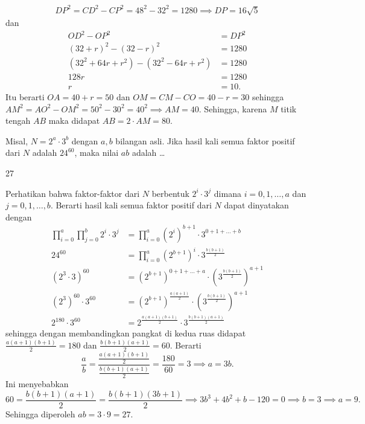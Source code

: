 \begin{solusi}
\begin{align*}
DP^2 = CD^2 - CP^2 = 48^2 - 32^2 = 1280 \implies DP = 16\sqrt{5}
\end{align*}
dan
\begin{align*}
OD^2 - OP^2 &= DP^2\\
(32+r)^2 - (32-r)^2 &= 1280\\
(32^2+64r+r^2)-(32^2-64r+r^2) &= 1280\\
128r &= 1280\\
r &= 10.
\end{align*}
Itu berarti $OA=40+r=50$ dan $OM = CM - CO = 40-r=30$ sehingga $AM^2 = AO^2-OM^2 = 50^2 - 30^2 = 40^2 \implies AM = 40$. Sehingga, karena $M$ titik tengah $AB$ maka didapat $AB = 2 \cdot AM = \boxed{80}$.
\end{solusi}

\begin{soalbaru}
Misal, $N = 2^a \cdot 3^b$ dengan $a, b$ bilangan asli. Jika hasil kali semua faktor positif dari $N$ adalah $24^{60}$, maka nilai $ab$ adalah \dots
\end{soalbaru}
\begin{jawaban}
27
\end{jawaban}
\begin{solusi}
Perhatikan bahwa faktor-faktor dari $N$ berbentuk $2^i \cdot 3^j$ dimana $i=0,1,\dots,a$ dan $j=0,1,\dots,b$. Berarti hasil kali semua faktor positif dari $N$ dapat dinyatakan dengan
\begin{align*}
\prod_{i=0}^{a} \prod_{j=0}^{b} 2^i \cdot 3^j &= \prod_{i=0}^{a}  (2^i)^{b+1} \cdot 3^{0+1+\dots+b}\\
24^{60} &= \prod_{i=0}^{a}  (2^{b+1})^i \cdot 3^{\frac{b(b+1)}{2}}\\
(2^3\cdot 3)^{60} &= (2^{b+1})^{0+1+\dots+a} \cdot (3^{\frac{b(b+1)}{2}})^{a+1}\\
(2^3)^{60}\cdot3^{60} &= (2^{b+1})^{\frac{a(a+1)}{2}} \cdot (3^{\frac{b(b+1)}{2}})^{a+1}\\
2^{180}\cdot 3^{60} &= 2^{\frac{a(a+1)(b+1)}{2}} \cdot 3^{\frac{b(b+1)(a+1)}{2}}
\end{align*}
sehingga dengan membandingkan pangkat di kedua ruas didapat $\frac{a(a+1)(b+1)}{2}=180$ dan $\frac{b(b+1)(a+1)}{2}=60$. Berarti
$$\dfrac{a}{b}=\dfrac{\frac{a(a+1)(b+1)}{2}}{\frac{b(b+1)(a+1)}{2}}=\dfrac{180}{60}=3 \implies a = 3b.$$
Ini menyebabkan
$$60=\frac{b(b+1)(a+1)}{2}=\frac{b(b+1)(3b+1)}{2} \implies 3b^3+4b^2+b-120=0 \implies b=3 \implies a = 9.$$
Sehingga diperoleh $ab = 3 \cdot 9 = \boxed{27}$.
\end{solusi}

